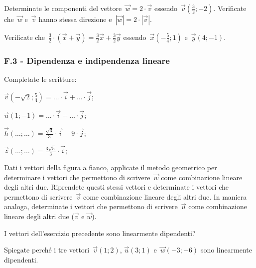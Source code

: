 \begin{esercizio}
\label{ese:F.5}
Determinate le componenti del vettore~$\vec{w}=2 \cdot \vec{v}$ essendo~$\vec{v}(\frac{3}{2};-2)$. Verificate che~$\vec{w}$ e~$\vec{v}$ hanno stessa direzione
e~$|\vec{w}|=2 \cdot |\vec{v}|$.
\end{esercizio}

\begin{esercizio}
\label{ese:F.6}
Verificate che~$\frac{3}{2} \cdot (\vec{x}+\vec{y})=\frac{3}{2}\vec{x}+\frac{3}{2}\vec{y}$ essendo~$\vec{x}(-\frac{5}{4};1)$ e~$\vec{y}(4;-1)$.
\end{esercizio}
\pagebreak
\subsubsection*{F.3 - Dipendenza e indipendenza lineare}
\begin{esercizio}
\label{ese:F.7}
Completate le scritture:
\begin{multicols}{2}
\begin{enumeratea}
\item $\vec{v}(-\sqrt{2};\frac {5}{4})=\ldots \cdot \vec{i}+\ldots \cdot \vec{j}$;
\item $\vec{u}(1;-1)=\ldots \cdot \vec{i}+\ldots \cdot \vec{j}$;
\item $\vec{h}(\ldots;\ldots)=\frac {\sqrt{3}}{3} \cdot \vec{i}-9 \cdot \vec{j}$;
\item $\vec{z}(\ldots;\ldots)=\frac {3 \sqrt{5}}{3} \cdot \vec{i}$;
\end{enumeratea}
\end{multicols}
\end{esercizio}

\begin{esercizio}
\label{ese:F.8}
\begin{multicols}{2}
 Dati i vettori della figura a fianco, applicate il metodo geometrico per determinare i vettori che permettono di scrivere~$\vec{w}$ come combinazione lineare degli altri due.
Riprendete questi stessi vettori e determinate i vettori che permettono di scrivere~$\vec{v}$ come combinazione lineare degli altri due. In maniera analoga, determinate i vettori che permettono di scrivere~$\vec{u}$ come combinazione lineare degli altri due ($\vec{v}$ e $\vec{w}$).
\begin{center}

\end{center}
\end{multicols}
\end{esercizio}

\begin{esercizio}
\label{ese:F.9}
I vettori dell'esercizio precedente sono linearmente dipendenti?
\end{esercizio}

\begin{esercizio}
\label{ese:F.10}
Spiegate perché i tre vettori~$\vec{v}(1;2)$, $\vec{u}(3;1)$ e~$\vec{w}(-3;-6)$ sono linearmente dipendenti.
\end{esercizio}


